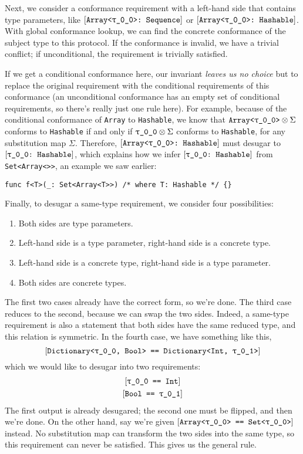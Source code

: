 \documentclass[../generics]{subfiles}
\begin{document}
\smallskip

Next, we consider a conformance requirement with a left-hand side that contains type parameters, like $\ConfReq{Array<\rT>}{Sequence}$ or $\ConfReq{Array<\rT>}{Hashable}$. With global conformance lookup, we can find the concrete conformance of the subject type to this protocol. If the conformance is invalid, we have a trivial conflict; if unconditional, the requirement is trivially satisfied.

If we get a conditional conformance here, our invariant \textsl{leaves us no choice} but to replace the original requirement with the conditional requirements of this conformance (an unconditional conformance has an empty set of conditional requirements, so there's really just one rule here). For example, because of the conditional conformance of \texttt{Array} to \texttt{Hashable}, we know that $\texttt{Array<\rT>}\otimes\Sigma$ conforms to \texttt{Hashable} if and only if $\rT\otimes\Sigma$ conforms to \texttt{Hashable}, for any substitution map $\Sigma$. Therefore, $\ConfReq{Array<\rT>}{Hashable}$ must desugar to $\ConfReq{\rT}{Hashable}$, which explains how we infer $\ConfReq{\rT}{Hashable}$ from \texttt{Set<Array<\rT>>}, an example we saw earlier:
\begin{Verbatim}
func f<T>(_: Set<Array<T>>) /* where T: Hashable */ {}
\end{Verbatim}

Finally, to desugar a same-type requirement, we consider four possibilities:
\begin{enumerate}
\item Both sides are type parameters.
\item Left-hand side is a type parameter, right-hand side is a concrete type.
\item Left-hand side is a concrete type, right-hand side is a type parameter.
\item Both sides are concrete types.
\end{enumerate}
The first two cases already have the correct form, so we're done. The third case reduces to the second, because we can swap the two sides. Indeed, a same-type requirement is also a statement that both sides have the same reduced type, and this relation is symmetric. In the fourth case, we have something like this,
\[\SameReq{Dictionary<\rT, Bool>}{Dictionary<Int, \rU>}\]
which we would like to desugar into two requirements:
\begin{gather*}
\SameReq{\rT}{Int}\\
\SameReq{Bool}{\rU}
\end{gather*}
The first output is already desugared; the second one must be flipped, and then we're done. On the other hand, say we're given $\SameReq{Array<\rT>}{Set<\rT>}$ instead. No substitution map can transform the two sides into the same type, so this requirement can never be satisfied. This gives us the general rule.
\end{document}

